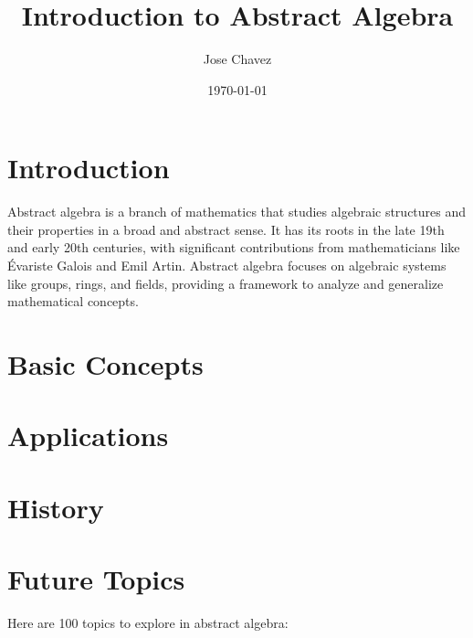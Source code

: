 \documentclass{article}
\title{Introduction to Abstract Algebra}
\author{Jose Chavez}
\date{\today}
\begin{document}
\maketitle

\section{Introduction}

Abstract algebra is a branch of mathematics that studies algebraic structures and their properties in a broad and abstract sense. It has its roots in the late 19th and early 20th centuries, with significant contributions from mathematicians like Évariste Galois and Emil Artin. Abstract algebra focuses on algebraic systems like groups, rings, and fields, providing a framework to analyze and generalize mathematical concepts.

\section{Basic Concepts}


\section{Applications}


\section{History}


\section{Future Topics}

Here are 100 topics to explore in abstract algebra:
\end{document}

